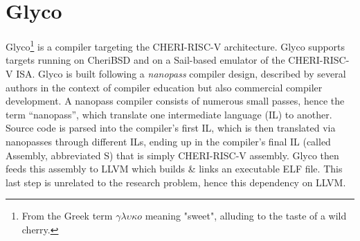 \documentclass[main.tex]{subfiles}
\begin{document}
\chapter{Glyco}
Glyco\footnote{From the Greek term $\gamma\lambda\upsilon\kappa{}o$ meaning "sweet", alluding to the taste of a wild cherry.} is a compiler targeting the CHERI-RISC-V architecture. Glyco supports targets running on CheriBSD and on a Sail-based emulator of the CHERI-RISC-V ISA. Glyco is built following a \emph{nanopass} compiler design, described by several authors in the context of compiler education but also commercial compiler development. A nanopass compiler consists of numerous small passes, hence the term \enquote{nanopass}, which translate one intermediate language (IL) to another. Source code is parsed into the compiler’s first IL, which is then translated via nanopasses through different ILs, ending up in the compiler's final IL (called Assembly, abbreviated S) that is simply CHERI-RISC-V assembly. Glyco then feeds this assembly to LLVM which builds \& links an executable ELF file. This last step is unrelated to the research problem, hence this dependency on LLVM.
\end{document}
